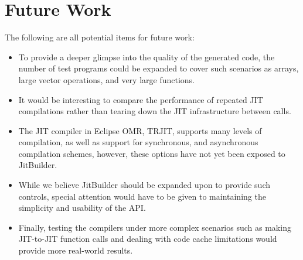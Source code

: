\section{Future Work}
\label{sec:future-work}
The following are all potential items for future work:
\begin{itemize}
    \item To provide a deeper glimpse into the quality of the generated code, the number of test programs could be expanded to cover such scenarios as arrays, large vector operations, and very large functions.
    \item It would be interesting to compare the performance of repeated JIT compilations rather than tearing down the JIT infrastructure between calls.
    \item The JIT compiler in Eclipse OMR, TRJIT, supports many levels of compilation, as well as support for synchronous, and asynchronous compilation schemes, however, these options have not yet been exposed to JitBuilder.
    \item While we believe JitBuilder should be expanded upon to provide such controls, special attention would have to be given to maintaining the simplicity and usability of the API.
    \item Finally, testing the compilers under more complex scenarios such as making JIT-to-JIT function calls and dealing with code cache limitations would provide more real-world results.
\end{itemize}
